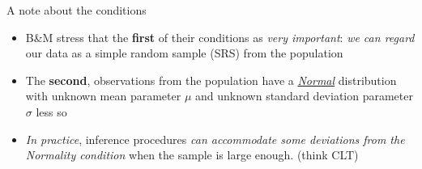 \documentclass{beamer}\usepackage[]{graphicx}\usepackage[]{color}
\begin{document}
\begin{frame}{A note about the conditions}
\begin{itemize}
	\setlength\itemsep{1em}
\item B\&M stress that the \textbf{first} of their conditions as \textit{very important}: \textit{we can regard} our data as a simple random sample (SRS) from  the population 
	\item The \textbf{second}, observations from the population have a \textit{\underline{Normal}} distribution with unknown mean parameter $\mu$ and unknown standard deviation parameter $\sigma$ less so
	\item \textit{In practice}, inference procedures \textit{can accommodate some deviations from
			the Normality condition} when the sample is large enough. (think CLT)
\end{itemize}
\end{frame}

\end{document}
